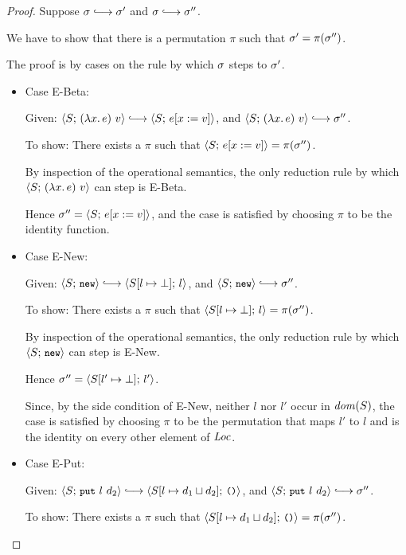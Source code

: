 \begin{proof}
  Suppose $\conf \parstepsto \conf'$ and $\conf \parstepsto \conf''$.

  We have to show that there is a permutation $\pi$ such that $\sigma'
  = \pi(\sigma'')$.

  The proof is by cases on the rule by which $\sigma$ steps to
  $\sigma'$.

  \begin{itemize}

  \item Case {\sc E-Beta}:

    Given: $\config{S}{\app{(\lam{x}{e})}{v}} \parstepsto
    \config{S}{\subst{e}{x}{v}}$, and
    $\config{S}{\app{(\lam{x}{e})}{v}} \parstepsto \conf''$.

    To show: There exists a $\pi$ such that
    $\langle S;\, e[x := v] \rangle = \pi(\sigma'')$.

    By inspection of the operational semantics, the only reduction
    rule by which $\langle S;\, (\lambda x.\,e)~v \rangle$ can step is {\sc
      E-Beta}.

    Hence $\sigma'' = \langle S;\, e[x := v] \rangle$, and the case is
    satisfied by choosing $\pi$ to be the identity function.

  \item Case {\sc E-New}: 

    Given: $\config{S}{\NEW} \parstepsto
    \config{\extSRaw{S}{l}{\bot}}{l}$, and $\config{S}{\NEW}
    \parstepsto \conf''$.

    To show: There exists a $\pi$ such that
    $\langle S[l \mapsto \bot];\, l \rangle = \pi(\sigma'')$.

    By inspection of the operational semantics, the only reduction
    rule by which $\langle S;\, \mbox{\small{\texttt{new}}} \rangle$ can step is {\sc E-New}.

    Hence $\sigma'' = \langle S[l' \mapsto \bot];\, l' \rangle$.

    Since, by the side condition of {\sc E-New}, neither $l$ nor $l'$
    occur in $\mathit{dom}(S)$, the case is satisfied by choosing $\pi$ to be
    the permutation that maps $l'$ to $l$ and is the identity on every
    other element of $\mathit{Loc}$.

  \item Case {\sc E-Put}:

    Given: $\config{S}{\putexp{l}{d_2}} \parstepsto
    \config{\extSRaw{S}{l}{\userlub{d_1}{d_2}}}{\unit}$, and
    $\config{S}{\putexp{l}{d_2}} \parstepsto \conf''$.

    To show: There exists a $\pi$ such that
    $\langle S[l \mapsto d_1 \sqcup d_2];\, \mbox{\small{\texttt{()}}} \rangle =
    \pi(\sigma'')$.


\end{itemize}
\end{proof}
